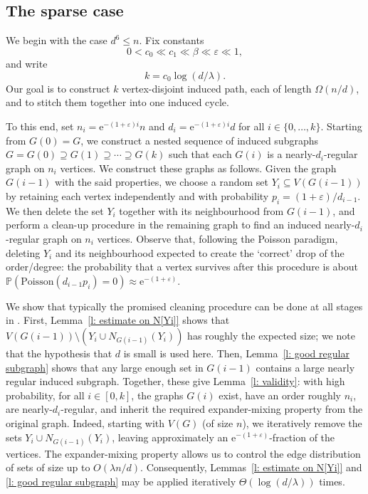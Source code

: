 \documentclass[reqno,a4paper]{amsart}
\theoremstyle{definition}
\newcommand{\eps}{\varepsilon}
\newcommand{\e}{\mathrm{e}}
\begin{document}
\subsection*{The sparse case}
We begin with the case $d^6\le n$. Fix constants
\[
0<c_0\ll c_1\ll \beta \ll \eps \ll 1,
\]
and write
\[
k=c_0\log(d/\lambda).
\]
Our goal is to construct $k$ vertex-disjoint induced path, each of length $\Omega(n/d)$, and to stitch them together into one induced cycle.

To this end, set $n_i=\e^{-(1+\eps)i}n$ and $ d_i=\e^{-(1+\eps)i}d$ for all $i\in\{0,\ldots ,k\}$. Starting from $G(0)=G$, we construct a nested sequence of induced subgraphs $G=G(0)\supseteq G(1)\supseteq\cdots\supseteq G(k)$ such that each $G(i)$ is a nearly-$d_{i}$-regular graph on $n_{i}$ vertices. 
We construct these graphs as follows. 
Given the graph $G(i-1)$ with the said properties,
we choose a random set $Y_i\subseteq V(G(i-1))$ by retaining each vertex independently and with probability $p_i = (1+\eps)/d_{i-1}$.
We then delete the set $Y_i$ together with its neighbourhood from $G(i-1)$, and perform a clean-up procedure in the remaining graph to find an induced nearly-$d_i$-regular graph on $n_i$ vertices. 
Observe that, following the Poisson paradigm, deleting $Y_i$ and its neighbourhood expected to create the `correct' drop of the order/degree: the probability that a vertex survives after this procedure is about $\mathbb{P}(\text{Poisson}(d_{i-1}p_i)=0)\approx \e^{-(1+\eps)}$.

We show that typically the promised cleaning procedure can be done at all stages in .
First, Lemma~\ref{l: estimate on N[Yi]} shows that $V(G(i-1))\setminus \left(Y_i\cup N_{G(i-1)}(Y_i)\right)$ has roughly the expected size; we note that the hypothesis that $d$ is small is used here. 
Then, Lemma~\ref{l: good regular subgraph} shows that any large enough set in $G(i-1)$ contains a large nearly regular induced subgraph. Together, these give Lemma~\ref{l: validity}: with high probability, for all $i\in [0,k]$, the graphs $G(i)$ exist, have an order roughly $n_i$, are nearly-$d_i$-regular, and inherit the required expander-mixing property from the original graph. Indeed, starting with $V(G)$ (of size $n$), we iteratively remove the sets $Y_i\cup N_{G(i-1)}(Y_i)$, leaving approximately an $\e^{-(1+\eps)}$-fraction of the vertices. The expander-mixing property allows us to control the edge distribution of sets of size up to $O(\lambda n/d)$. Consequently, Lemmas~\ref{l: estimate on N[Yi]} and \ref{l: good regular subgraph} may be applied iteratively $\Theta(\log(d/\lambda))$ times. 
\end{document}
